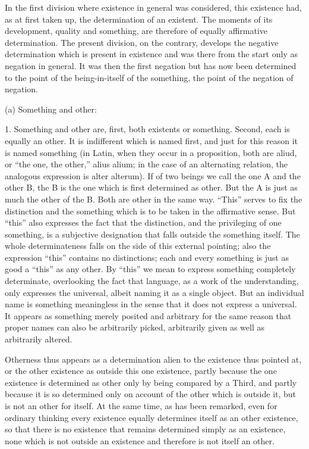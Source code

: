 In the first division where existence in general was considered,
this existence had, as at first taken up, the determination of an existent.
The moments of its development, quality and something,
are therefore of equally affirmative determination.
The present division, on the contrary, develops
the negative determination which is present in existence
and was there from the start only as negation in general.
It was then the first negation but has now been determined to
the point of the being-in-itself of the something,
the point of the negation of negation.

(a) Something and other:

1. Something and other are,
first, both existents or something.
Second, each is equally an other.
It is indifferent which is named first,
and just for this reason it is named something
(in Latin, when they occur in a proposition,
both are aliud, or “the one, the other,” alius alium;
in the case of an alternating relation,
the analogous expression is alter alterum).
If of two beings we call the one A and the other B,
the B is the one which is first determined as other.
But the A is just as much the other of the B.
Both are other in the same way.
“This” serves to fix the distinction
and the something which is to be taken in the affirmative sense.
But “this” also expresses the fact that the distinction,
and the privileging of one something,
is a subjective designation that falls outside the something itself.
The whole determinateness falls on the side of this external pointing;
also the expression “this” contains no distinctions;
each and every something is just as good a “this” as any other.
By “this” we mean to express something completely determinate,
overlooking the fact that language, as a work of the understanding,
only expresses the universal, albeit naming it as a single object.
But an individual name is something meaningless in the sense
that it does not express a universal.
It appears as something merely posited
and arbitrary for the same reason
that proper names can also be arbitrarily picked,
arbitrarily given as well as arbitrarily altered.

Otherness thus appears as a determination
alien to the existence thus pointed at,
or the other existence as outside this one existence,
partly because the one existence is determined as other
only by being compared by a Third,
and partly because it is so determined
only on account of the other which is outside it,
but is not an other for itself.
At the same time, as has been remarked,
even for ordinary thinking every existence
equally determines itself as an other existence,
so that there is no existence
that remains determined simply as an existence,
none which is not outside an existence
and therefore is not itself an other.


